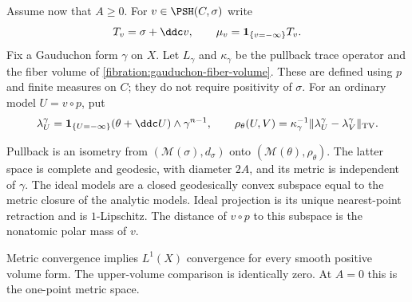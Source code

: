 Assume now that $A\geq0$. For $v\in\PSH(C,\sigma)$ write
\[
 T_v=\sigma+\ddc v,\qquad
 \mu_v=\mathbf1_{\{v=-\infty\}}T_v.
\]
Fix a Gauduchon form $\gamma$ on $X$. Let $L_\gamma$ and
$\kappa_\gamma$ be the pullback trace operator and the fiber
volume of \cref{fibration:gauduchon-fiber-volume}. These are
defined using $p$ and finite measures on $C$; they do not require
positivity of $\sigma$. For an ordinary model $U=v\circ p$, put
\[
 \lambda_U^\gamma
   =\mathbf1_{\{U=-\infty\}}
       (\theta+\ddc U)\wedge\gamma^{n-1},\qquad
 \rho_\theta(U,V)
   =\kappa_\gamma^{-1}
       \|\lambda_U^\gamma-\lambda_V^\gamma\|_{\mathrm{TV}}.
\]

\begin{theorem}\label{curve-backgrounds647:full-model-metric}
Pullback is an isometry from
$(\mathcal M(\sigma),d_\sigma)$ onto
$(\mathcal M(\theta),\rho_\theta)$. The latter space is complete
and geodesic, with diameter $2A$, and its metric is independent
of $\gamma$. The ideal models are a closed geodesically convex
subspace equal to the metric closure of the analytic models.
Ideal projection is its unique nearest-point retraction and is
$1$-Lipschitz. The distance of $v\circ p$ to this subspace is the
nonatomic polar mass of $v$.

Metric convergence implies $L^1(X)$ convergence for every smooth
positive volume form. The upper-volume comparison is identically
zero. At $A=0$ this is the one-point metric space.
\end{theorem}
